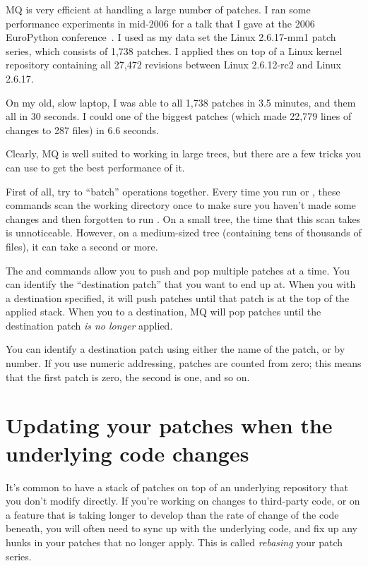MQ is very efficient at handling a large number of patches.  I ran
some performance experiments in mid-2006 for a talk that I gave at the
2006 EuroPython conference~\cite{web:europython}.  I used as my data
set the Linux 2.6.17-mm1 patch series, which consists of 1,738
patches.  I applied thes on top of a Linux kernel repository
containing all 27,472 revisions between Linux 2.6.12-rc2 and Linux
2.6.17.

On my old, slow laptop, I was able to
 all 1,738 patches in 3.5 minutes,
and  them all in 30 seconds.  I
could  one of the biggest patches (which made 22,779
lines of changes to 287 files) in 6.6 seconds.

Clearly, MQ is well suited to working in large trees, but there are a
few tricks you can use to get the best performance of it.

First of all, try to ``batch'' operations together.  Every time you
run  or , these commands scan the working
directory once to make sure you haven't made some changes and then
forgotten to run .  On a small tree, the time that
this scan takes is unnoticeable.  However, on a medium-sized tree
(containing tens of thousands of files), it can take a second or more.

The  and  commands allow you to push and pop
multiple patches at a time.  You can identify the ``destination
patch'' that you want to end up at.  When you  with a
destination specified, it will push patches until that patch is at the
top of the applied stack.  When you  to a destination, MQ
will pop patches until the destination patch \emph{is no longer}
applied.

You can identify a destination patch using either the name of the
patch, or by number.  If you use numeric addressing, patches are
counted from zero; this means that the first patch is zero, the second
is one, and so on.

\section{Updating your patches when the underlying code changes}
\label{sec:mq:merge}

It's common to have a stack of patches on top of an underlying
repository that you don't modify directly.  If you're working on
changes to third-party code, or on a feature that is taking longer to
develop than the rate of change of the code beneath, you will often
need to sync up with the underlying code, and fix up any hunks in your
patches that no longer apply.  This is called \emph{rebasing} your
patch series.

